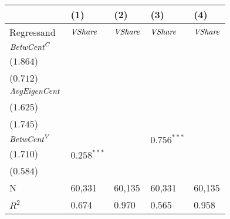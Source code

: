 \begin{tabular}{lllll}
\toprule
{} &                                    (1) &                                    (2) &                         (3) &                                    (4) \\
\midrule
Regressand                  &                         ${\it VShare}$ &                         ${\it VShare}$ &              ${\it VShare}$ &                         ${\it VShare}$ \\
${\it BetwCent}^C$          &  \makecell{$0.672^{***}$ \\ ($1.864$)} &  \makecell{$0.257^{***}$ \\ ($0.712$)} &                 \makecell{} &                            \makecell{} \\
${\it AvgEigenCent}$        &                            \makecell{} &  \makecell{$0.397^{***}$ \\ ($1.625$)} &                 \makecell{} &  \makecell{$0.426^{***}$ \\ ($1.745$)} \\
\midrule ${\it BetwCent}^V$ &                                        &                                        &  $0.756^{***}$ \\ ($1.710$) &             $0.258^{***}$ \\ ($0.584$) \\
N                           &                                 60,331 &                                 60,135 &                      60,331 &                                 60,135 \\
$R^2$                       &                                  0.674 &                                  0.970 &                       0.565 &                                  0.958 \\
\bottomrule
\end{tabular}
